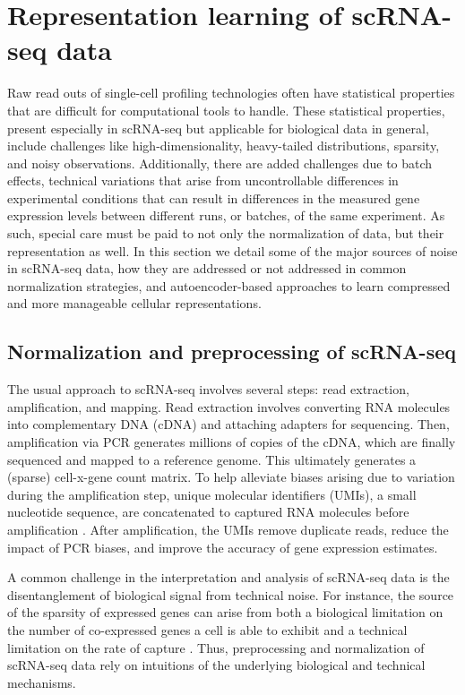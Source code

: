 \section{Representation learning of scRNA-seq data} \label{sec:scrna-seq}
Raw read outs of single-cell profiling technologies often have statistical properties that are difficult for computational tools to handle.
These statistical properties, present especially in scRNA-seq but applicable for biological data in general,
include challenges like high-dimensionality, heavy-tailed distributions, sparsity, and noisy observations.
Additionally, there are added challenges due to batch effects, 
technical variations that arise from uncontrollable differences in experimental conditions that can result in differences in the measured gene expression levels between different runs, or batches, of the same experiment.
As such, special care must be paid to not only the normalization of data, but their representation as well.
In this section we detail some of the major sources of noise in scRNA-seq data, how they are addressed or not addressed in common normalization strategies, and autoencoder-based approaches to learn compressed and more manageable cellular representations.

\subsection{Normalization and preprocessing of scRNA-seq}
The usual approach to scRNA-seq involves several steps: read extraction, amplification, and mapping.
Read extraction involves converting RNA molecules into complementary DNA (cDNA) and attaching adapters for sequencing.
Then, amplification via PCR generates millions of copies of the cDNA, which are finally sequenced and mapped to a reference genome.
This ultimately generates a (sparse) cell-x-gene count matrix.
To help alleviate biases arising due to variation during the amplification step, unique molecular identifiers (UMIs), a small nucleotide sequence, are concatenated to captured RNA molecules before amplification \cite{islam2014}.
After amplification, the UMIs remove duplicate reads, reduce the impact of PCR biases, and improve the accuracy of gene expression estimates.

A common challenge in the interpretation and analysis of scRNA-seq data is the disentanglement of biological signal from technical noise.
For instance, the source of the sparsity of expressed genes can arise from both a biological limitation on the number of co-expressed genes a cell is able to exhibit and a technical limitation on the rate of capture \cite{breda2021}.
Thus, preprocessing and normalization of scRNA-seq data rely on intuitions of the underlying biological and technical mechanisms.

